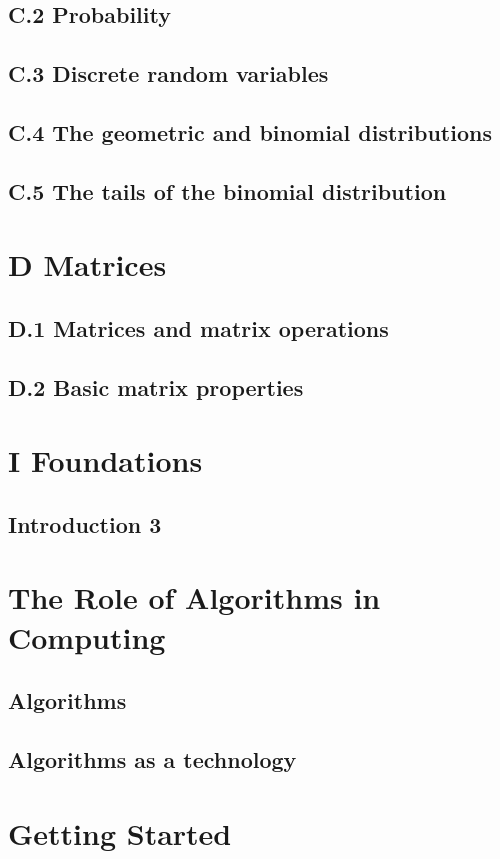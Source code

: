 \documentclass[a4paper]{article}
\begin{document}
\subsection*{C.2 Probability}
\subsection*{C.3 Discrete random variables}
\subsection*{C.4 The geometric and binomial distributions}
\subsection*{C.5 The tails of the binomial distribution}

\newpage
\section*{D Matrices}
\subsection*{D.1 Matrices and matrix operations}
\subsection*{D.2 Basic matrix properties}

\newpage
\section*{I Foundations}
\subsection*{Introduction 3}

\newpage
\section{The Role of Algorithms in Computing}
\subsection{Algorithms}
\subsection{Algorithms as a technology}

\newpage
\section{Getting Started}
\end{document}
